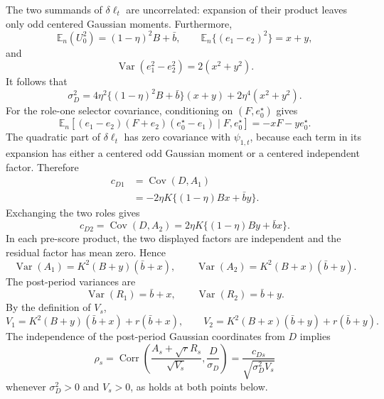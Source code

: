 The two summands of \(\delta\ell_t\) are uncorrelated: expansion of their product leaves only odd centered Gaussian moments.  Furthermore,
\[
 \mathbb E_n(U_0^2)=(1-\eta)^2B+\bar b,
 \qquad
 \mathbb E_n\{(e_1-e_2)^2\}=x+y,
\]
and
\[
 \operatorname{Var}(e_1^2-e_2^2)=2(x^2+y^2).
\]
It follows that
\[
 \sigma_D^2
 =4\eta^2\{(1-\eta)^2B+\bar b\}(x+y)
  +2\eta^4(x^2+y^2).
\]
For the role-one selector covariance, conditioning on \((F,e_0^{\star})\) gives
\[
 \mathbb E_n\!\left[(e_1-e_2)(F+e_2)(e_0^{\star}-e_1)
       \mid F,e_0^{\star}\right]
 =-xF-ye_0^{\star}.
\]
The quadratic part of \(\delta\ell_t\) has zero covariance with \(\psi_{1,t}\), because each term in its expansion has either a centered odd Gaussian moment or a centered independent factor.  Therefore
\[
 \begin{aligned}
 c_{D1}
 &=\operatorname{Cov}(D,A_1)\\
 &=-2\eta K\{(1-\eta)Bx+\bar b y\}.
 \end{aligned}
\]
Exchanging the two roles gives
\[
 c_{D2}=\operatorname{Cov}(D,A_2)
 =2\eta K\{(1-\eta)By+\bar b x\}.
\]
In each pre-score product, the two displayed factors are independent and the residual factor has mean zero.  Hence
\[
 \operatorname{Var}(A_1)=K^2(B+y)(\bar b+x),
 \qquad
 \operatorname{Var}(A_2)=K^2(B+x)(\bar b+y).
\]
The post-period variances are
\[
 \operatorname{Var}(R_1)=\bar b+x,
 \qquad
 \operatorname{Var}(R_2)=\bar b+y.
\]
By the definition of \(V_s\),
\[
 V_1=K^2(B+y)(\bar b+x)+r(\bar b+x),
 \qquad
 V_2=K^2(B+x)(\bar b+y)+r(\bar b+y).
\]
The independence of the post-period Gaussian coordinates from \(D\) implies
\[
 \rho_s
 =\operatorname{Corr}\!\left(\frac{A_s+\sqrt rR_s}{\sqrt{V_s}},\frac D{\sigma_D}\right)
 =\frac{c_{Ds}}{\sqrt{\sigma_D^2V_s}}
\]
whenever \(\sigma_D^2>0\) and \(V_s>0\), as holds at both points below.

